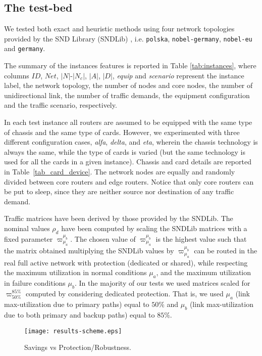 \documentclass[final,5p,times,twocolumn]{elsarticle}
\begin{document}
\subsection{The test-bed}\label{sec:testbed} We tested both exact and heuristic methods using four network topologies provided by the SND Library (SNDLib) \cite{orlowski10}, i.e. {\tt polska}, {\tt nobel-germany}, {\tt nobel-eu} and {\tt germany}. 

The summary of the instances features is reported in Table \ref{tab:instances}, where columns $ID$, $Net$, $|N|$-$|N_c|$, $|A|$, $|D|$, \textit{equip} and \textit{scenario} represent the instance label, the network topology, the number of nodes and core nodes, the number of unidirectional link, the number of traffic demands, the equipment configuration and the traffic scenario, respectively.

In each test instance all routers are assumed to be equipped with the same type of chassis and the same type of cards. However, we experimented with three different configuration cases, \textit{alfa}, \textit{delta}, and \textit{eta}, wherein the chassis technology is always the same, while the type of cards is varied (but the same technology is used for all the cards in a given instance). Chassis and card details are reported in Table~\ref{tab_card_device}. The network nodes are equally and randomly divided between core routers and edge routers. Notice that only core routers can be put to sleep, since they are neither source nor destination of any traffic demand. 

Traffic matrices have been derived by those provided by the SNDLib. The nominal values $\rho_d$ have been computed by scaling the SNDLib matrices with a fixed parameter $\varpi_{\mu_a}^{\mu_b}$. The chosen value of $\varpi_{\mu_a}^{\mu_b}$ is the highest value such that the matrix obtained multiplying the SNDLib values by $\varpi_{\mu_a}^{\mu_b}$ can be routed in the real full active network with protection (dedicated or shared), while respecting the maximum utilization in normal conditions $\mu_a$, and the maximum utilization in failure conditions $\mu_b$. In the majority of our tests we used matrices scaled for $\varpi_{50\%}^{85\%}$ computed by considering dedicated protection. That is, we used $\mu_a$ (link max-utilization due to primary paths) equal to $50\%$ and  $\mu_b$ (link max-utilization due to both primary and backup paths) equal to $85\%$. 

\begin{figure*}[!th]\centering
  \texttt{[image: results-scheme.eps]}
  \caption{Savings vs Protection/Robustness.}
\label{fig:scheme}
\end{figure*}
\end{document}
